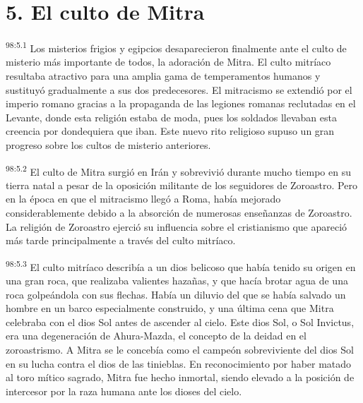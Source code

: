 \section*{5. El culto de Mitra}
\par
\textsuperscript{98:5.1} Los misterios frigios y egipcios desaparecieron finalmente ante el culto de misterio más importante de todos, la adoración de Mitra. El culto mitríaco resultaba atractivo para una amplia gama de temperamentos humanos y sustituyó gradualmente a sus dos predecesores. El mitracismo se extendió por el imperio romano gracias a la propaganda de las legiones romanas reclutadas en el Levante, donde esta religión estaba de moda, pues los soldados llevaban esta creencia por dondequiera que iban. Este nuevo rito religioso supuso un gran progreso sobre los cultos de misterio anteriores.

\par
\textsuperscript{98:5.2} El culto de Mitra surgió en Irán y sobrevivió durante mucho tiempo en su tierra natal a pesar de la oposición militante de los seguidores de Zoroastro. Pero en la época en que el mitracismo llegó a Roma, había mejorado considerablemente debido a la absorción de numerosas enseñanzas de Zoroastro. La religión de Zoroastro ejerció su influencia sobre el cristianismo que apareció más tarde principalmente a través del culto mitríaco.

\par
\textsuperscript{98:5.3} El culto mitríaco describía a un dios belicoso que había tenido su origen en una gran roca, que realizaba valientes hazañas, y que hacía brotar agua de una roca golpeándola con sus flechas. Había un diluvio del que se había salvado un hombre en un barco especialmente construido, y una última cena que Mitra celebraba con el dios Sol antes de ascender al cielo. Este dios Sol, o Sol Invictus, era una degeneración de Ahura-Mazda, el concepto de la deidad en el zoroastrismo. A Mitra se le concebía como el campeón sobreviviente del dios Sol en su lucha contra el dios de las tinieblas. En reconocimiento por haber matado al toro mítico sagrado, Mitra fue hecho inmortal, siendo elevado a la posición de intercesor por la raza humana ante los dioses del cielo.

